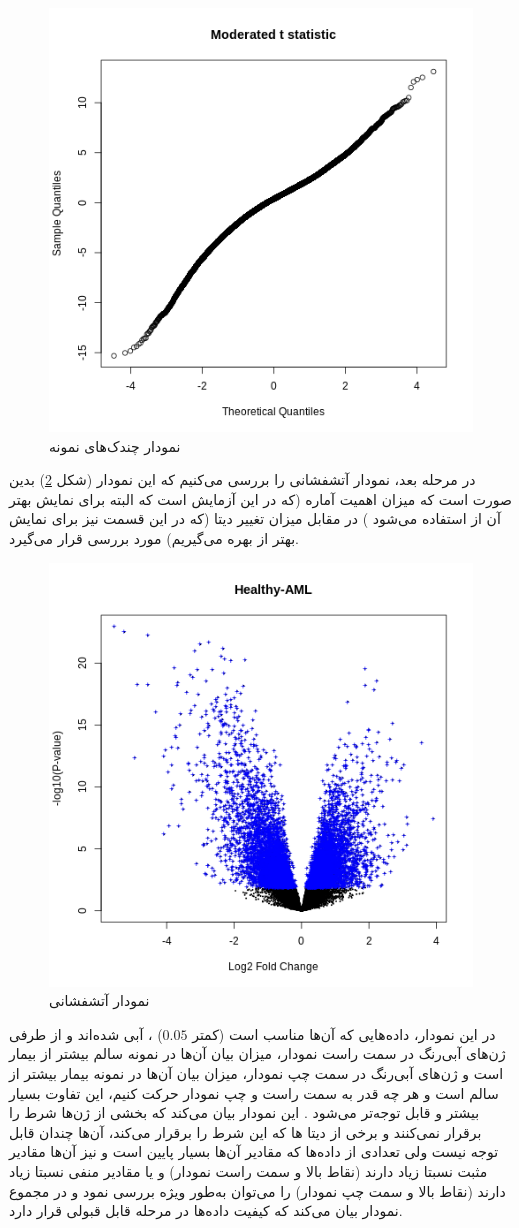 \documentclass{article}
\begin{document}
\begin{figure}[h!]
	\centering
	\includegraphics[width=0.5\columnwidth]{figs/qq.png}
	\caption{نمودار چندک‌های نمونه}
	\label{fig:qq}
\end{figure}

در مرحله بعد، نمودار آتشفشانی
را بررسی می‌کنیم که این نمودار (شکل \ref{fig:volcano}) بدین صورت است که میزان اهمیت آماره (که در این آزمایش 
است که البته برای نمایش بهتر آن از 
استفاده می‌شود
)
در مقابل میزان تغییر دیتا (که در این قسمت نیز برای نمایش بهتر 
از 
بهره می‌گیریم)
مورد بررسی قرار می‌گیرد.

\begin{figure}[h!]
	\centering
	\includegraphics[width=0.5\columnwidth]{figs/volcano.png}
	\caption{نمودار آتشفشانی}
	\label{fig:volcano}
\end{figure}

در این نمودار، داده‌هایی که 
آن‌ها مناسب است (کمتر 
$0.05$)
،
آبی شده‌اند و از طرفی ژن‌های آبی‌رنگ در سمت راست نمودار، میزان بیان آن‌ها در نمونه سالم بیشتر از بیمار است و ژن‌های آبی‌رنگ در سمت چپ نمودار، میزان بیان آن‌ها در نمونه بیمار بیشتر از سالم است و هر چه قدر به سمت راست و چپ نمودار حرکت کنیم، این تفاوت بسیار بیشتر و قابل توجه‌تر می‌شود . 
این نمودار بیان می‌کند که بخشی از ژن‌ها شرط 
را برقرار نمی‌کنند و برخی از دیتا ها که این شرط را برقرار می‌کند، 
آن‌ها چندان قابل توجه نیست  ولی تعدادی از داده‌ها که مقادیر 
آن‌ها بسیار پایین است و نیز 
آن‌ها مقادیر مثبت نسبتا زیاد دارند (نقاط بالا و سمت راست نمودار) و یا مقادیر منفی نسبتا زیاد دارند (نقاط بالا و سمت چپ نمودار) را می‌توان به‌طور ویژه بررسی نمود و در مجموع نمودار بیان می‌کند که کیفیت داده‌ها در مرحله قابل قبولی قرار دارد.
\end{document}
